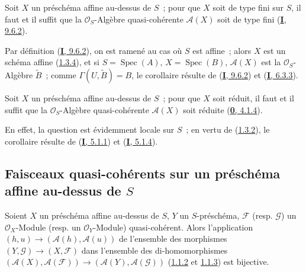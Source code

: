 \begin{corollary}[1.3.7]
\label{II.1.3.7-fr}
Soit $X$ un préschéma affine au-dessus de $S$~; pour que $X$ soit de type fini
sur $S$, il faut et il suffit que la $\mathcal{O}_S$-Algèbre quasi-cohérente
$\mathcal{A}(X)$ soit de type fini
\upshape(\hyperref[I.9.6.2-fr]{\textbf{I}, 9.6.2}).
\end{corollary}

Par définition (\hyperref[I.9.6.2-fr]{\textbf{I}, 9.6.2}), on est ramené au cas où
$S$ est affine~; alors $X$ est un schéma affine
(\hyperref[II.1.3.4-fr]{1.3.4}), et si $S=\operatorname{Spec}(A)$,
$X=\operatorname{Spec}(B)$, $\mathcal{A}(X)$ est la
$\mathcal{O}_S$-Algèbre $\widetilde{B}$~; comme
$\Gamma(U,\widetilde{B})=B$, le corollaire résulte de
(\hyperref[I.9.6.2-fr]{\textbf{I}, 9.6.2}) et
(\hyperref[I.6.3.3-fr]{\textbf{I}, 6.3.3}).

\begin{corollary}[1.3.8]
\label{II.1.3.8-fr}
Soit $X$ un préschéma affine au-dessus de $S$~; pour que $X$ soit réduit, il
faut et il suffit que la $\mathcal{O}_S$-Algèbre quasi-cohérente
$\mathcal{A}(X)$ soit réduite
\upshape(\hyperref[0.4.1.4-fr]{\textbf{0}, 4.1.4}).
\end{corollary}

En effet, la question est évidemment locale sur $S$~; en vertu de
(\hyperref[II.1.3.2-fr]{1.3.2}), le corollaire résulte de
(\hyperref[I.5.1.1-fr]{\textbf{I}, 5.1.1}) et
(\hyperref[I.5.1.4-fr]{\textbf{I}, 5.1.4}).

\subsection{Faisceaux quasi-cohérents sur un préschéma affine au-dessus de
$S$}
\label{subsection:II.1.4-fr}

\begin{proposition}[1.4.1]
\label{II.1.4.1-fr}
Soient $X$ un préschéma affine au-dessus de $S$, $Y$ un $S$-préschéma,
$\mathcal{F}$ \textup{(resp. $\mathcal{G}$)} un $\mathcal{O}_X$-Module \textup{(resp.} un
$\mathcal{O}_Y$-Module\textup{)} quasi-cohérent. Alors l'application
$(h,u)\to(\mathcal{A}(h),\mathcal{A}(u))$ de l'ensemble des morphismes
$(Y,\mathcal{G})\to(X,\mathcal{F})$ dans l'ensemble des di-homomorphismes
$(\mathcal{A}(X),\mathcal{A}(\mathcal{F}))\to
(\mathcal{A}(Y),\mathcal{A}(\mathcal{G}))$
\textup{(\hyperref[II.1.1.2-fr]{1.1.2} et
\hyperref[II.1.1.3-fr]{1.1.3})} est bijective.
\end{proposition}

